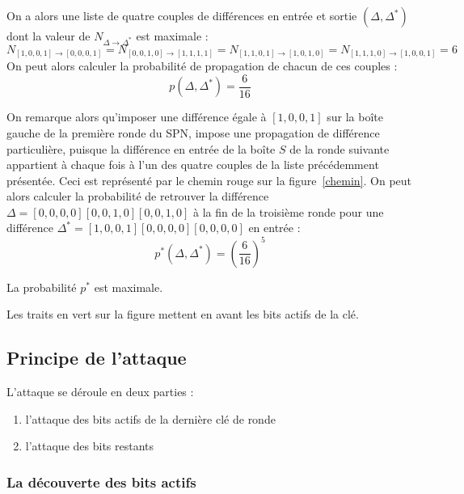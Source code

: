 \documentclass[a4paper,11pt]{article}
\begin{document}
On a alors une liste de quatre couples de différences en entrée et sortie $(\Delta, \Delta^*)$ dont
la valeur de $N_{\Delta \rightarrow \Delta^*}$ est maximale :
\begin{displaymath}
    N_{[1,0,0,1] \rightarrow [0,0,0,1]} = N_{[0,0,1,0] \rightarrow [1,1,1,1]} = N_{[1,1,0,1]
    \rightarrow [1,0,1,0]} = N_{[1,1,1,0] \rightarrow [1,0,0,1]} = 6
\end{displaymath}
On peut alors calculer la probabilité de propagation de chacun de ces couples :
\begin{displaymath}
    p(\Delta, \Delta^*) = \frac{6}{16}
\end{displaymath}

On remarque alors qu'imposer une différence égale à $[1,0,0,1]$ sur la boîte gauche de la première
ronde du SPN, impose une propagation de différence particulière, puisque la différence en entrée de
la boîte $S$ de la ronde suivante appartient à chaque fois à l'un des quatre couples de la liste
précédemment présentée. Ceci est représenté par le chemin rouge sur la figure~\ref{chemin}. On peut
alors calculer la probabilité de retrouver la différence $\Delta = [0,0,0,0][0,0,1,0][0,0,1,0]$ à la
fin de la troisième ronde pour une différence $\Delta^* = [1,0,0,1][0,0,0,0][0,0,0,0]$ en entrée :
\begin{displaymath}
    p^*(\Delta, \Delta^*) = \left ( \frac{6}{16} \right ) ^ 5
\end{displaymath}

La probabilité $p^*$ est maximale.

\begin{rmq*}
    Les traits en vert sur la figure mettent en avant les bits actifs de la clé.
\end{rmq*}

\subsection*{Principe de l'attaque}

L'attaque se déroule en deux parties : 
\begin{enumerate}
    \item l'attaque des bits actifs de la dernière clé de ronde
    \item l'attaque des bits restants
\end{enumerate}

\subsubsection*{La découverte des bits actifs}
\end{document}

